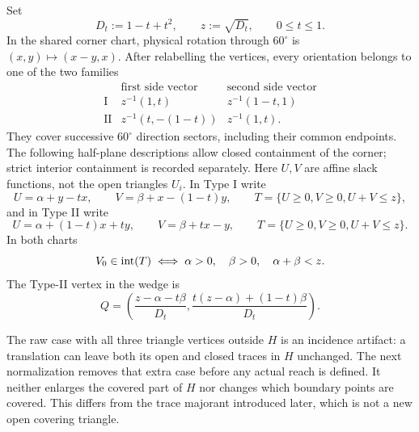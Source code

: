 Set
\[
 D_t:=1-t+t^2,\qquad z:=\sqrt{D_t},\qquad0\le t\le1.
\]
In the shared corner chart, physical rotation through $60^\circ$ is
$(x,y)\mapsto(x-y,x)$. After relabelling the vertices, every orientation
belongs to one of the two families
\[
\begin{array}{c|cc}
 &\text{first side vector}&\text{second side vector}\\ \hline
\mathrm I&z^{-1}(1,t)&z^{-1}(1-t,1)\\
\mathrm {II}&z^{-1}(t,-(1-t))&z^{-1}(1,t).
\end{array}
\]
They cover successive $60^\circ$ direction sectors, including their
common endpoints. The following half-plane descriptions allow closed
containment of the corner; strict interior containment is recorded separately.
Here $U,V$ are affine slack functions, not the open triangles $U_i$.
In Type I write
\begin{equation}
 U=\alpha+y-tx,\qquad V=\beta+x-(1-t)y,\qquad
 T=\{U\ge0,V\ge0,U+V\le z\},
 \label{eq:orientation-type-I}
\end{equation}
and in Type II write
\begin{equation}
 U=\alpha+(1-t)x+ty,\qquad V=\beta+tx-y,\qquad
 T=\{U\ge0,V\ge0,U+V\le z\}.
 \label{eq:orientation-type-II}
\end{equation}
In both charts
\begin{equation}
 V_0\in\mathrm{int}(T)\iff
 \alpha>0,\quad\beta>0,\quad\alpha+\beta<z.
 \label{eq:orientation-interior}
\end{equation}
The Type-II vertex in the wedge is
\begin{equation}
 Q=\left(
 \frac{z-\alpha-t\beta}{D_t},
 \frac{t(z-\alpha)+(1-t)\beta}{D_t}
 \right).
 \label{eq:orientation-type-II-Q}
\end{equation}

The raw case with all three triangle vertices outside $H$ is an incidence
artifact: a translation can leave both its open and closed traces in $H$
unchanged. The next normalization removes that extra case before any actual
reach is defined. It neither enlarges the covered part of $H$ nor changes
which boundary points are covered. This differs from the trace majorant
introduced later, which is not a new open covering triangle.

